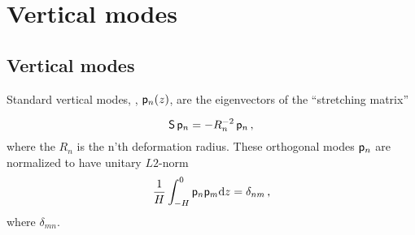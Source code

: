 \documentclass[11pt]{article}
\newcommand{\sS}{\mathsf{S}}
\begin{document}


\section*{Vertical modes}

\subsection*{Vertical modes}
Standard vertical modes, , $\sp_n (z)$, are the eigenvectors of the ``stretching matrix''

\begin{equation}
\sS \,\sp_n = -R_n^{-2}\, \sp_n\,,
\end{equation}
where the $R_n$ is the n'th deformation radius. These orthogonal modes $\sp_n$ are normalized to
have unitary $L2$-norm
\begin{equation}
    \frac{1}{H}\int_{-H}^{0} \sp_n \sp_m \dd z = \delta_{nm}\com
\end{equation}
where $\delta_{mn}$.
\end{document}
